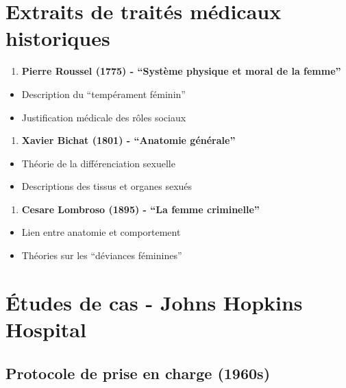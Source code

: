 \documentclass[
  letterpaper,
  DIV=11,
  numbers=noendperiod]{scrreprt}
\providecommand{\tightlist}{%
  \setlength{\itemsep}{0pt}\setlength{\parskip}{0pt}}\usepackage{longtable,booktabs,array}
\begin{document}
\section{Extraits de traités médicaux
historiques}\label{extraits-de-traituxe9s-muxe9dicaux-historiques}

\begin{enumerate}
\def\labelenumi{\arabic{enumi}.}
\tightlist
\item
  \textbf{Pierre Roussel (1775) - ``Système physique et moral de la
  femme''}
\end{enumerate}

\begin{itemize}
\tightlist
\item
  Description du ``tempérament féminin''
\item
  Justification médicale des rôles sociaux
\end{itemize}

\begin{enumerate}
\def\labelenumi{\arabic{enumi}.}
\setcounter{enumi}{1}
\tightlist
\item
  \textbf{Xavier Bichat (1801) - ``Anatomie générale''}
\end{enumerate}

\begin{itemize}
\tightlist
\item
  Théorie de la différenciation sexuelle
\item
  Descriptions des tissus et organes sexués
\end{itemize}

\begin{enumerate}
\def\labelenumi{\arabic{enumi}.}
\setcounter{enumi}{2}
\tightlist
\item
  \textbf{Cesare Lombroso (1895) - ``La femme criminelle''}
\end{enumerate}

\begin{itemize}
\tightlist
\item
  Lien entre anatomie et comportement
\item
  Théories sur les ``déviances féminines''
\end{itemize}

\section{Études de cas - Johns Hopkins
Hospital}\label{uxe9tudes-de-cas---johns-hopkins-hospital}

\subsection{Protocole de prise en charge
(1960s)}\label{protocole-de-prise-en-charge-1960s}
\end{document}
